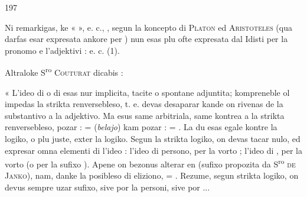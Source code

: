 \begin{VUpage}[201]{197}

Ni remarkigas, ke «  », e. c., , segun\nl
la koncepto di \textsc{Platon} ed \textsc{Aristoteles} (qua darfas esar\nl
expresata ankore per ) nun esas plu ofte\nl
expresata dal Idisti per la pronomo  e l'adjektivi : \nl
{} e. c. (1).

Altraloke S\textsuperscript{ro} \textsc{Couturat} dicabis :

« L'ideo di  o di  esas nur implicita, tacite\nl
o spontane adjuntita; kompreneble ol impedas la strikta\nl
renversebleso, t. e. devas desaparar kande on rivenas de la\nl
substantivo a la adjektivo. Ma esus same arbitriala, same\nl
kontrea a la strikta renversebleso, pozar :  = \nl
(\textit{belajo}) kam pozar :  = . La du\nl
esas egale kontre la logiko, o plu juste, exter la logiko.\nl
Segun la strikta logiko, on devas tacar nulo, ed expresar\nl
omna elementi di l'ideo : l'ideo di persono, per la vorto\nl
{}; l'ideo di , per la vorto  (o per la sufixo ).\nl
Apene on bezonus alterar  en  (sufixo propozita da\nl
S\textsuperscript{ro} \textsc{de Janko}), nam, danke la posibleso di eliziono, \nl
{} = . Rezume, segun strikta logiko, on devus\nl
sempre uzar sufixo, sive por la personi, sive por ...


\end{VUpage}
